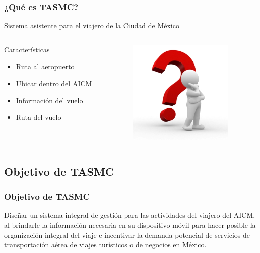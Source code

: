 \documentclass[12pt]{beamer}
\begin{document}
\begin{frame}[c]
	\frametitle{¿Qué es TASMC?}
	\begin{block}{}
		Sistema asistente para el viajero de la Ciudad de México
	\end{block}
	\begin{columns} 
		\begin{column}{5cm}
			\begin{block}{Características} \small 
				\begin{itemize}
					\item Ruta al aeropuerto
					\item Ubicar dentro del AICM
					\item Información del vuelo
					\item Ruta del vuelo
				\end{itemize} 
			\end{block} 
		\end{column}
		\begin{column}{4cm} 
			\begin{center}
				\includegraphics[height=5cm]{imagenes/queEs.jpg}
			\end{center} 
		\end{column} 
	\end{columns}
\end{frame}

\subsection{Objetivo de TASMC}

\begin{frame}
	\frametitle{Objetivo de TASMC}
	\begin{block}{}
		\justifying
		Diseñar un sistema integral de gestión para las actividades del viajero del AICM, al brindarle la información 						necesaria en su dispositivo móvil para hacer posible la organización integral del viaje e incentivar la demanda 					potencial de servicios de transportación aérea de viajes turísticos o de negocios en México.
	\end{block}
\end{frame}
\end{document}
